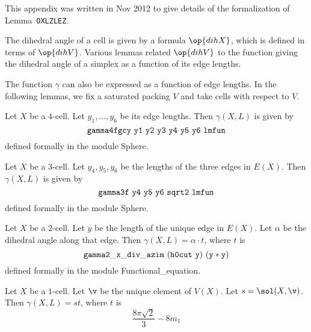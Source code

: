 

\def\bve{{\underline {\hat\u}}}
\def\ke{ k_{\mathbf e}}
\def\pe{{ {\mathbf p}}_{\mathbf e}}
\def\cX{{\mathcal X}}
\def\gg{\check\gamma}
\def\QX{\op{QX}}
\def\QY{\op{QY}}
\def\QU{\op{QU}}
\def\eps{\epsilon}

\newpage
{}\label{sec:oxl}

This appendix was written in Nov 2012 to give details of the formalization of Lemma~{\tt OXLZLEZ}.


The dihedral angle of a cell is given by a formula $\op{dihX}$, which is defined in terms
of $\op{dihV}$.  Various lemmas related $\op{dihV}$ to the function giving the dihedral
angle of a simplex as a function of its edge lengths.

The function $\gamma$ can also be expressed as a function of edge lengths.
In the following lemmas, we fix a saturated packing $V$ and take cells with respect to $V$.


\begin{lemma} Let $X$ be a $4$-cell.  Let $y_1,\ldots,y_6$ be its edge lengths.  
Then $\gamma(X,L)$  is given by 
\[
{\tt gamma4fgcy~y1~y2~y3~y4~y5~y6~lmfun}
\]
defined formally in the module Sphere.
\end{lemma}

\begin{lemma} Let $X$ be a $3$-cell.  Let $y_4,y_5,y_6$ be the lengths of the three edges
in $E(X)$.  Then $\gamma(X,L)$ is given by
\[
{\tt gamma3f~y4~y5~y6~sqrt2~lmfun}
\]
defined formally in the module Sphere.
\end{lemma}

\begin{lemma} Let $X$ be a $2$-cell.  Let $y$ be the length of the unique edge in $E(X)$.
Let $\alpha$ be the dihedral angle along that edge.
Then $\gamma(X,L)=\alpha\cdot t$, where $t$ is
\[
{\tt
gamma2\_x\_div\_azim~(h0cut~y)~(y*y)
}
\]
defined formally in the module Functional\_equation.
\end{lemma}

\begin{lemma} Let $X$ be a $1$-cell.  Let $\v$ be the unique element of $V(X)$.
Let $s=\sol(X,\v)$.  Then $\gamma(X,L)=s t$, where $t$ is
\[
\frac{8\pi \sqrt2}{3} - 8 m_1
\]
\end{lemma}

